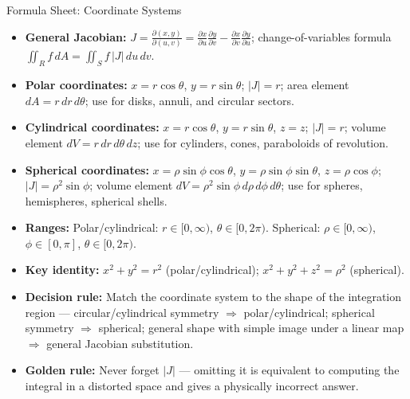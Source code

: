\documentclass[12pt,a4paper]{article}
\begin{document}
\begin{learnbox}{Formula Sheet: Coordinate Systems}
\begin{itemize}[leftmargin=1.5em]
  \item \textbf{General Jacobian:} $\displaystyle J = \frac{\partial(x,y)}{\partial(u,v)}
        = \frac{\partial x}{\partial u}\frac{\partial y}{\partial v}
        - \frac{\partial x}{\partial v}\frac{\partial y}{\partial u}$;
        change-of-variables formula $\iint_R f\,dA = \iint_S f\,|J|\,du\,dv$.

  \item \textbf{Polar coordinates:} $x = r\cos\theta$, $y = r\sin\theta$;
        $|J| = r$; area element $dA = r\,dr\,d\theta$;
        use for disks, annuli, and circular sectors.

  \item \textbf{Cylindrical coordinates:} $x = r\cos\theta$, $y = r\sin\theta$, $z = z$;
        $|J| = r$; volume element $dV = r\,dr\,d\theta\,dz$;
        use for cylinders, cones, paraboloids of revolution.

  \item \textbf{Spherical coordinates:} $x = \rho\sin\phi\cos\theta$,
        $y = \rho\sin\phi\sin\theta$, $z = \rho\cos\phi$;
        $|J| = \rho^2\sin\phi$; volume element $dV = \rho^2\sin\phi\,d\rho\,d\phi\,d\theta$;
        use for spheres, hemispheres, spherical shells.

  \item \textbf{Ranges:} Polar/cylindrical: $r \in [0,\infty)$, $\theta \in [0,2\pi)$.
        Spherical: $\rho \in [0,\infty)$, $\phi \in [0,\pi]$, $\theta \in [0,2\pi)$.

  \item \textbf{Key identity:} $x^2+y^2 = r^2$ (polar/cylindrical);
        $x^2+y^2+z^2 = \rho^2$ (spherical).

  \item \textbf{Decision rule:} Match the coordinate system to the shape of the integration region
        --- circular/cylindrical symmetry $\Rightarrow$ polar/cylindrical; spherical symmetry
        $\Rightarrow$ spherical; general shape with simple image under a linear map
        $\Rightarrow$ general Jacobian substitution.

  \item \textbf{Golden rule:} Never forget $|J|$ --- omitting it is equivalent to computing the
        integral in a distorted space and gives a physically incorrect answer.
\end{itemize}
\end{learnbox}
\end{document}
